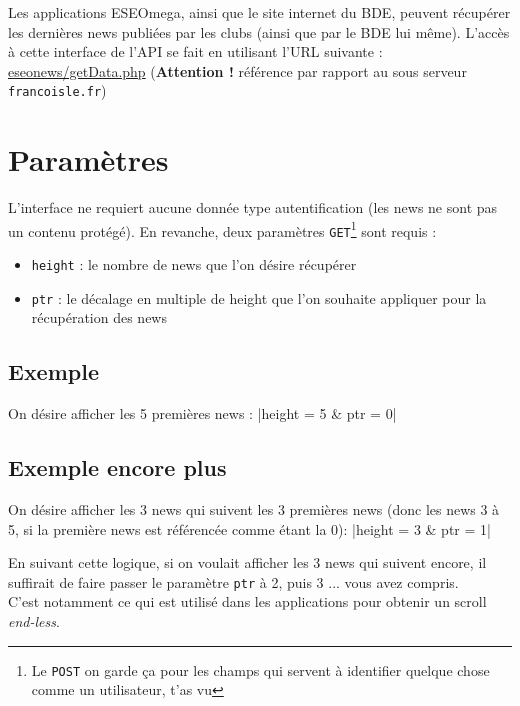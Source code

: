 \documentclass[12pt,a4paper,oneside]{report}
\begin{document}
Les applications ESEOmega, ainsi que le site internet du BDE, peuvent récupérer les dernières news publiées par les clubs (ainsi que par le BDE lui même). L'accès à cette interface de l'API se fait en utilisant l'URL suivante :\\

\noindent \url{eseonews/getData.php} (\textbf{Attention !} référence par rapport au sous serveur \texttt{francoisle.fr})

\section{Paramètres}

L'interface ne requiert aucune donnée type autentification (les news ne sont pas un contenu protégé). En revanche, deux paramètres \texttt{GET}\footnote{Le \texttt{POST} on garde ça pour les champs qui servent à identifier quelque chose comme un utilisateur, t'as vu} sont requis :

\begin{itemize}
\item \texttt{height} : le nombre de news que l'on désire récupérer
\item \texttt{ptr} : le décalage en multiple de height que l'on souhaite appliquer pour la récupération des news
\end{itemize}

\subsection{Exemple}

On désire afficher les 5 premières news : |height = 5 & ptr = 0|

\subsection{Exemple encore plus}

On désire afficher les 3 news qui suivent les 3 premières news (donc les news 3 à 5, si la première news est référencée comme étant la 0): |height = 3 & ptr = 1|

\noindent En suivant cette logique, si on voulait afficher les 3 news qui suivent encore, il suffirait de faire passer le paramètre \texttt{ptr} à 2, puis 3 ... vous avez compris.\\

\noindent C'est notamment ce qui est utilisé dans les applications pour obtenir un scroll \textsl{end-less}.
\end{document}
